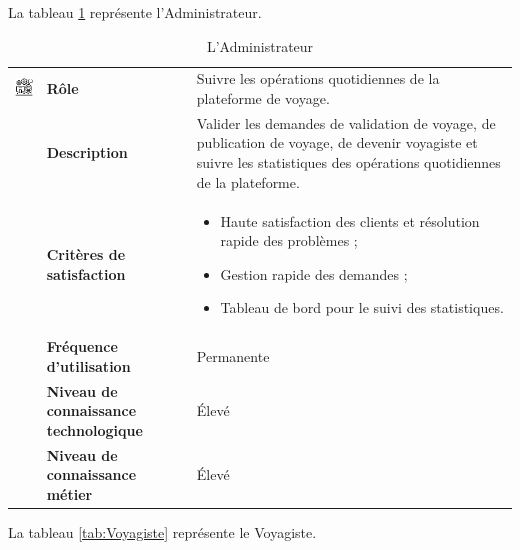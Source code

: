 \documentclass[12pt]{report}
\begin{document}
				La tableau \ref{tab:aAdmHandeha} représente l'Administrateur.
				\begin{longtable}{|p{3cm}|p{4cm}|p{7cm}|}
				  \caption{L'Administrateur}
				  \label{tab:aAdmHandeha}\\
				  \hline
				\endfirsthead
				\hline
				\endhead
				\begin{minipage}{3cm}
					\includegraphics[width=2cm]{adminHandeha.png}
				\end{minipage} & \textbf{Rôle} & Suivre les opérations quotidiennes de la plateforme de voyage.\\ \cline{2-3}
						& \textbf{Description} & Valider les demandes de validation de voyage, de publication de voyage, de devenir voyagiste et suivre les statistiques des opérations quotidiennes de la plateforme. \\ \cline{2-3}
						& \textbf{Critères de satisfaction} & \begin{itemize}
																\item Haute satisfaction des clients et résolution rapide des problèmes ;
																\item Gestion rapide des demandes ;
																\item Tableau de bord pour le suivi des statistiques.
															\end{itemize}\\ \cline{2-3}
						& \textbf{Fréquence d’utilisation} & Permanente \\ \cline{2-3}
						& \textbf{Niveau de connaissance technologique} & Élevé \\ \cline{2-3}
						& \textbf{Niveau de connaissance métier} & Élevé \\ 
				\hline
				\end{longtable}
				\FloatBarrier

				La tableau \ref{tab:Voyagiste} représente le Voyagiste.
\end{document}
